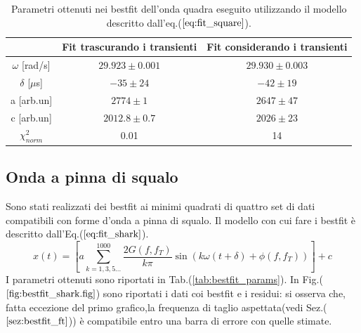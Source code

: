 \documentclass{article}
\begin{document}
            \begin{table}[H]
                \centering
                \begin{tabular}{ccc}
                    \hline
                     & Fit trascurando i transienti & Fit considerando i transienti \\
                    \hline
                    $\omega$ [rad/s]        & $29.923 \pm 0.001$    & $29.930\pm 0.003$ \\
                    $\delta$ [$\mu$s]       & $-35\pm 24$           & $-42\pm 19$ \\
                    a [arb.un]              & $2774 \pm 1$          & $2647 \pm 47$ \\
                    c [arb.un]              & $2012.8 \pm 0.7$      & $2026 \pm 23$ \\
                    $\chi^{2}_{norm}$ & 0.01 & 14 \\
                    \hline
                \end{tabular}
                \caption{Parametri ottenuti nei bestfit dell'onda quadra eseguito utilizzando il modello descritto dall'eq.($\ref{eq:fit_square}$).}
                \label{tab:bestfit_square}
            \end{table}
            

            
    \subsection{Onda a pinna di squalo}
        Sono stati realizzati dei bestfit ai minimi quadrati
        di quattro set di dati compatibili con forme d'onda a pinna di squalo.
        Il modello con cui fare i bestfit è descritto dall'Eq.($\ref{eq:fit_shark}$).
                \begin{equation}
                    x(t) = \left[a\sum_{k=1,3,5...}^{1000} \frac{2G(f,f_T)}{k\pi}\sin\left(k\omega (t+\delta)+\phi(f,f_T)\right)\right] +c
                    \label{eq:fit_shark}
                \end{equation} 
        I parametri ottenuti sono riportati in Tab.(\ref{tab:bestfit_params}).%
        In Fig.($\ref{fig:bestfit_shark.fig}$) sono riportati i dati coi bestfit e 
        i residui: si osserva che, fatta eccezione del primo grafico,la frequenza di taglio aspettata(vedi Sez.($\ref{sez:bestfit_ft}$)) è compatibile entro una 
        barra di errore con quelle stimate. 
\end{document}
